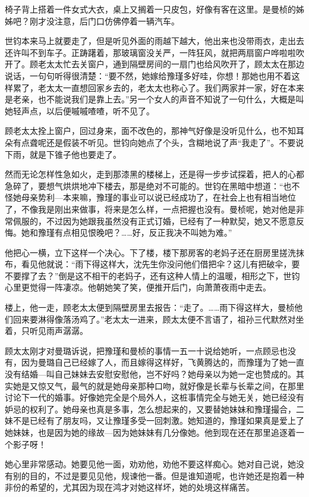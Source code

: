 \par 椅子背上搭着一件女式大衣，桌上又搁着一只皮包，好像有客在这里。是曼桢的姊姊吧？刚才没注意，后门口仿佛停着一辆汽车。
\par 世钧本来马上就要走了，但是听见外面的雨越下越大，他出来也没带雨衣，走出去还许叫不到车子。正踌躇着，那玻璃窗没关严，一阵狂风，就把两扇窗户哗啦啦吹开了。顾老太太忙去关窗户，通到隔壁房间的一扇门也给风吹开了，顾太太在那边说话，一句句听得很清楚：“要不然，她嫁给豫瑾多好哇，你想！那她也用不着这样累了，老太太一直想回家乡去的，老太太也称心了。我们两家并一家，好在本来是老亲，也不能说我们是靠上去。”另一个女人的声音不知说了一句什么，大概是叫她轻声点，以后便嘁嘁喳喳，听不见了。
\par 顾老太太拴上窗户，回过身来，面不改色的，那神气好像是没听见什么，也不知耳朵有点聋呢还是假装不听见。世钧向她点了个头，含糊地说了声“我走了”。不要说下雨，就是下锥子他也要走了。
\par 然而无论怎样性急如火，走到那漆黑的楼梯上，还是得一步步试探着，把人的心都急碎了，要想气烘烘地冲下楼去，那是绝对不可能的。世钧在黑暗中想道：“也不怪她母亲势利—本来嘛，豫瑾的事业可以说已经成功了，在社会上也有相当地位了，不像我是刚出来做事，将来是怎么样，一点把握也没有。曼桢呢，她对他是非常佩服的，不过因为她跟我虽然没有正式订婚，已经有了一种默契，她又不愿意反悔。她和豫瑾有点相见恨晚吧？……好，反正我决不叫她为难。”
\par 他把心一横，立下这样一个决心。下了楼，楼下那房客的老妈子还在厨房里搓洗抹布，看见他就说：“雨下得这样大，沈先生你没问他们借把伞？这儿有把破伞，要不要撑了去？”倒是这不相干的老妈子，还有这种人情上的温暖，相形之下，世钧心里更觉得一阵凄凉。他朝她笑了笑，便推开后门，向萧萧夜雨中走去。
\par 楼上，他一走，顾老太太便到隔壁房里去报告：“走了。……雨下得这样大，曼桢他们回来要淋得像落汤鸡了。”老太太一进来，顾太太便不言语了，祖孙三代默然对坐着，只听见雨声潺潺。
\par 顾太太刚才对曼璐诉说，把豫瑾和曼桢的事情一五一十说给她听，一点顾忌也没有，因为曼璐自己已经嫁了人，而且嫁得这样好，飞黄腾达的，而豫瑾为了她一直没有结婚—叫自己妹妹去安慰安慰他，岂不好吗？她母亲以为她一定也赞成的。其实她是又惊又气，最气的就是她母亲那种口吻，就好像是长辈与长辈之间，在那里讨论下一代的婚事。好像她完全是个局外人，这桩事情完全与她无关，她已经没有妒忌的权利了。她母亲也真是多事，怎么想起来的，又要替她妹妹和豫瑾撮合，二妹不是已经有了朋友吗，又让豫瑾多受一回刺激。她知道的，豫瑾如果真是爱上了她妹妹，也是因为她的缘故—因为她妹妹有几分像她。他到现在还在那里追逐着一个影子呀！
\par 她心里非常感动。她要见他一面，劝劝他，劝他不要这样痴心。她对自己说，她没有别的目的，不过是要见见他，规谏他一番。但是谁知道呢，也许她还是抱着一种非份的希望的，尤其因为现在鸿才对她这样坏，她的处境这样痛苦。
